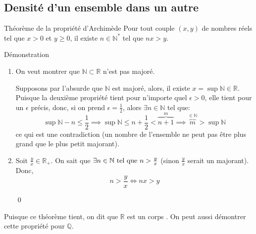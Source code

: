 \documentclass{article}
\begin{document}
\subsection{Densité d'un ensemble dans un autre}
\begin{parag}{Théorème de la propriété d'Archimède}
    Pour tout couple $\left(x, y\right)$ de nombres réels tel que $x > 0$ et $y \geq 0$, il existe $n \in \mathbb{N}^*$ tel que $nx > y$.

    \begin{subparag}{Démonstration}
        \begin{enumerate}
            \item On veut montrer que $\mathbb{N} \subset \mathbb{R}$ n'est pas majoré.

            Supposons par l'absurde que $\mathbb{N}$ est majoré, alors, il existe $x = \sup \mathbb{N} \in \mathbb{R}$. Puisque la deuxième propriété tient pour n'importe quel $\epsilon > 0$, elle tient pour un $\epsilon$ précis, donc, si on prend $\epsilon = \frac{1}{2}$, alors $\exists n \in \mathbb{N}$ tel que:
            \[\sup \mathbb{N} - n \leq \frac{1}{2} \implies \sup \mathbb{N} \leq n +\frac{1}{2} < \overbrace{n + 1}^{m} \implies \overbrace{m}^{\in \mathbb{N}} > \sup \mathbb{N}\]
            ce qui est une contradiction (un nombre de l'ensemble ne peut pas être plus grand que le plus petit majorant).

        \item Soit $\frac{y}{x} \in \mathbb{R}_+$. On sait que $\exists n \in \mathbb{N} \text{ tel que } n > \frac{y}{x}$ (sinon $\frac{y}{x}$ serait un majorant). Donc,
            \[n > \frac{y}{x} \iff nx > y\]

            \qed
        \end{enumerate}

    \end{subparag}

    Puisque ce théorème tient, on dit que $\mathbb{R}$ est un corps . On peut aussi démontrer cette propriété pour $\mathbb{Q}$.
\end{parag}
\end{document}
